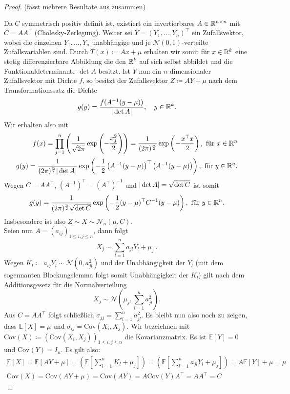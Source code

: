 \begin{proof}(fasst mehrere Resultate aus \cite{brokate2016grundwissen} zusammen)
	
	Da $ C $ symmetrisch positiv definit ist, existiert ein invertierbares $ A \in \mathbb{R}^{n \times n} $ mit $ C = AA^{\top} $ (Cholesky-Zerlegung).
	Weiter sei $ Y = (Y_1,\dots,Y_n)^{\top} $ ein Zufallsvektor, wobei die einzelnen $ Y_1,\dots,Y_n $ unabhängige und je $ \mathcal{N}(0,1) $-verteilte Zufallsvariablen sind. 
	Durch $ T(x) \coloneqq Ax + \mu $ erhalten wir somit für $ x \in \mathbb{R}^k $ eine stetig differenzierbare Abbildung die den $ \mathbb{R}^k $ auf sich selbst abbildet und die Funktionaldeterminante $ \det A$ besitzt.
	Ist $ Y $ nun ein $ n $-dimensionaler Zufallsvektor mit Dichte $ f $, so besitzt der Zufallsvektor $ Z \coloneqq  AY + \mu$ nach dem Transformationssatz die Dichte
	\[
		g(y) = \frac{f(A^{-1}(y-\mu))}{| \det A |}, \quad y \in \mathbb{R}^k .
	\]
	Wir erhalten also mit 
	\begin{align*}
		f(x) = \prod_{j=1}^n \left( \frac{1}{\sqrt{2\pi}}\exp\left(-\frac{x_j^2}{2}\right) \right) = \frac{1}{(2\pi)^{\frac{n}{2}}} \exp \left( - \frac{x^{\top}x}{2}\right), \text{ für } x \in \mathbb{R}^n \\
		g(y) = \frac{1}{(2\pi)^{\frac{n}{2}}| \det A |} \exp \left( - \frac{1}{2} \left( A^{-1}(y-\mu)\right)^{\top}\left( A^{-1}(y-\mu)\right)\right), \text{ für }y \in \mathbb{R}^n .
	\end{align*}
	Wegen $ C = A A^{\top} $, $ (A^{-1})^{\top} = (A^{\top})^{-1} $ und $ | \det A | = \sqrt{\det C} $ ist somit 
	\[
		g(y) = \frac{1}{(2\pi)^{\frac{n}{2}}\sqrt{\det C}} \exp \left( - \frac{1}{2} (y-\mu)^{\top}C^{-1} (y-\mu)\right), \text{ für }y \in \mathbb{R}^n.
	\]
	Insbesondere ist also $ Z \sim X \sim \mathcal{N}_n(\mu,C) $.\\
	Seien nun $ A = (a_{ij})_{1 \leq i,j \leq n} $, dann folgt
	\[
		X_j \sim \sum_{l=1}^n a_{jl} Y_l + \mu_j \ .
	\]
	Wegen $ K_l \coloneqq a_{ij} Y_l  \sim \mathcal{N}(0,a_{jl}^2) $ und der Unabhängigkeit der $ Y_l $ (mit dem sogennanten Blockungslemma folgt somit Unabhängigkeit der $ K_l $) gilt nach dem Additionsgesetz für die Normalverteilung 
	\[
		X_j\sim \mathcal{N} \left( \mu_j,\sum_{l=1}^{n}a_{jl}^2 \right).
	\]
	Aus $ C = A A^{\top}  $ folgt schließlich $ \sigma_{jj} = \sum_{l=1}^{n} a_{jl}^2 $.
	Es bleibt nun also noch zu zeigen, dass $ \mathbb{E}[X] = \mu $ und $ \sigma_{ij} = \text{Cov}(X_i,X_j) $.
	Wir bezeichnen mit $ \text{Cov}(X) \coloneqq (\text{Cov}(X_i,X_j))_{1 \leq i,j \leq n} $
	die Kovarianzmatrix.
	Es ist $ \mathbb{E}[Y] = 0 $ und  $\text{Cov}(Y) = I_n $.
	Es gilt also:
	\begin{align*}
		\mathbb{E}[X] = \mathbb{E}[AY + \mu] = (\mathbb{E}[\sum_{l=1}^{n}K_l+\mu_j]) =(\mathbb{E}[\sum_{l=1}^{n}a_{jl}Y_l+\mu_j])= A \mathbb{E}[Y] + \mu = \mu \\
		\text{Cov}(X) = \text{Cov}(AY + \mu) =  \text{Cov}(AY) = A \text{Cov}(Y) A^{\top} = AA^{\top} = C
	\end{align*}	
	
\end{proof}

